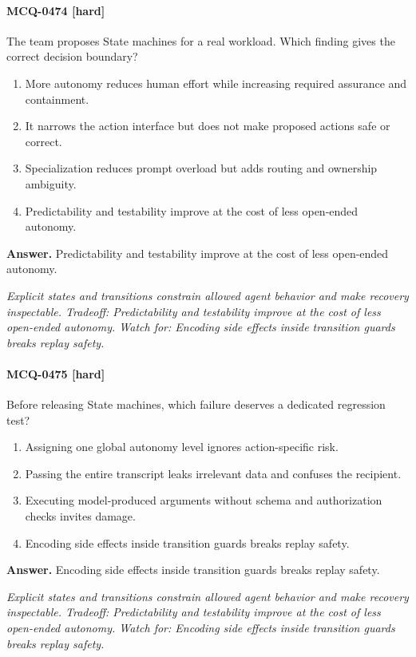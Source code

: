 \paragraph{MCQ-0474 [hard]} The team proposes State machines for a real workload. Which finding gives the correct decision boundary?
\begin{enumerate}[label=\Alph*.]
\item More autonomy reduces human effort while increasing required assurance and containment.
\item It narrows the action interface but does not make proposed actions safe or correct.
\item Specialization reduces prompt overload but adds routing and ownership ambiguity.
\item Predictability and testability improve at the cost of less open-ended autonomy.
\end{enumerate}
\noindent\textbf{Answer.} Predictability and testability improve at the cost of less open-ended autonomy.
\par\textit{Explicit states and transitions constrain allowed agent behavior and make recovery inspectable. Tradeoff: Predictability and testability improve at the cost of less open-ended autonomy. Watch for: Encoding side effects inside transition guards breaks replay safety.}
\paragraph{MCQ-0475 [hard]} Before releasing State machines, which failure deserves a dedicated regression test?
\begin{enumerate}[label=\Alph*.]
\item Assigning one global autonomy level ignores action-specific risk.
\item Passing the entire transcript leaks irrelevant data and confuses the recipient.
\item Executing model-produced arguments without schema and authorization checks invites damage.
\item Encoding side effects inside transition guards breaks replay safety.
\end{enumerate}
\noindent\textbf{Answer.} Encoding side effects inside transition guards breaks replay safety.
\par\textit{Explicit states and transitions constrain allowed agent behavior and make recovery inspectable. Tradeoff: Predictability and testability improve at the cost of less open-ended autonomy. Watch for: Encoding side effects inside transition guards breaks replay safety.}
